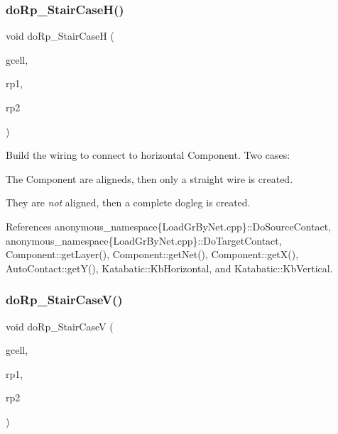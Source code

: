 \mbox{\label{group__LoadGlobalRouting_ga3291d84592215974fe4052c00304bdb1}} 
\subsubsection{\texorpdfstring{do\+Rp\+\_\+\+Stair\+Case\+H()}{doRp\_StairCaseH()}}
{\footnotesize\ttfamily void do\+Rp\+\_\+\+Stair\+CaseH (\begin{DoxyParamCaption}\item[{\hyperlink{classKatabatic_1_1GCell}{G\+Cell} $\ast$}]{gcell,  }\item[{\textbf{ Component} $\ast$}]{rp1,  }\item[{\textbf{ Component} $\ast$}]{rp2 }\end{DoxyParamCaption})\hspace{0.3cm}{\ttfamily [static]}}

Build the wiring to connect to horizontal Component. Two cases\+:
\begin{DoxyItemize}
\item The Component are aligneds, then only a straight wire is created.
\item They are {\itshape not} aligned, then a complete dogleg is created.
\end{DoxyItemize}

 

References anonymous\+\_\+namespace\{\+Load\+Gr\+By\+Net.\+cpp\}\+::\+Do\+Source\+Contact, anonymous\+\_\+namespace\{\+Load\+Gr\+By\+Net.\+cpp\}\+::\+Do\+Target\+Contact, Component\+::get\+Layer(), Component\+::get\+Net(), Component\+::get\+X(), Auto\+Contact\+::get\+Y(), Katabatic\+::\+Kb\+Horizontal, and Katabatic\+::\+Kb\+Vertical.

\mbox{\label{group__LoadGlobalRouting_ga6361fb0e90f35cd59063a1ee971ef2a9}} 
\subsubsection{\texorpdfstring{do\+Rp\+\_\+\+Stair\+Case\+V()}{doRp\_StairCaseV()}}
{\footnotesize\ttfamily void do\+Rp\+\_\+\+Stair\+CaseV (\begin{DoxyParamCaption}\item[{\hyperlink{classKatabatic_1_1GCell}{G\+Cell} $\ast$}]{gcell,  }\item[{\textbf{ Component} $\ast$}]{rp1,  }\item[{\textbf{ Component} $\ast$}]{rp2 }\end{DoxyParamCaption})\hspace{0.3cm}{\ttfamily [static]}}

